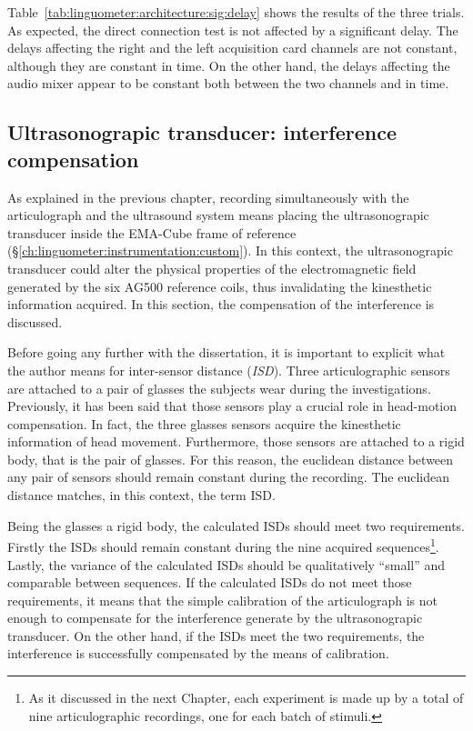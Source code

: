 Table~\ref{tab:linguometer:architecture:sig:delay} shows the results of the
three trials. As expected, the direct connection test is not affected by a
significant delay. The delays affecting the right and the left acquisition card
channels are not constant, although they are constant in time. 
On the other hand, the delays affecting the audio mixer appear to be constant
both between the two channels and in time.
\subsection{Ultrasonograpic transducer: interference compensation}
\label{sec:linguometer:technical:interference}
As explained in the previous chapter, recording simultaneously with the
articulograph and the ultrasound system means placing the ultrasonograpic 
transducer inside the EMA-Cube frame of reference
(\S\ref{ch:linguometer:instrumentation:custom}).
In this context, the ultrasonograpic transducer could  
alter the physical properties of the electromagnetic field generated by the six
AG500 reference coils, thus invalidating the kinesthetic information acquired.
In this section, the compensation of the interference is discussed.

Before going any further with the dissertation, it is important to explicit what
the author means for inter-sensor distance (\emph{ISD}).
Three articulographic sensors are attached to a pair of glasses the subjects 
wear during the investigations.
Previously, it has been said that those sensors play a crucial role in
head-motion compensation.
In fact, the three glasses sensors acquire the kinesthetic information of head
movement.
Furthermore, those sensors are attached to a rigid body, that is the pair of
glasses. For this reason, the euclidean distance between any pair of sensors
should remain constant during the recording. The euclidean distance matches, in
this context, the term ISD.

Being the glasses a rigid body, the calculated ISDs should meet two
requirements.
Firstly the ISDs should remain constant during the nine acquired
sequences\footnote{As it discussed in the next Chapter, each experiment is made
up by a total of nine articulographic recordings, one for each batch of 
stimuli.}.
Lastly, the variance of the calculated ISDs should be qualitatively ``small''
and comparable between sequences.
If the calculated ISDs do not meet those requirements, it means that the 
simple calibration of the articulograph is not enough to compensate for the
interference generate by the ultrasonograpic transducer.
On the other hand, if the ISDs meet the two requirements, the interference is
successfully compensated by the means of calibration.

